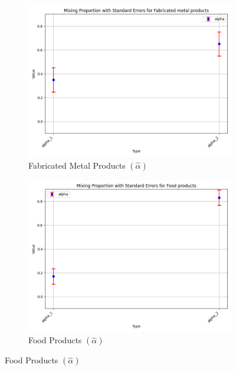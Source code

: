 \documentclass{article}
\begin{document}
\begin{figure}[ht!]
    \centering 
    \caption{I.I.D Normal Model}
    \begin{subfigure}[t]{0.32\textwidth}
        \centering
        \includegraphics[width=\textwidth]{figure/empirical_stat_normal_alpha_with_error_bars_Fabricated metal products.png}
        \caption{Fabricated Metal Products $(\hat\alpha)$}
    \end{subfigure}
    \begin{subfigure}[t]{0.32\textwidth}
        \centering
        \includegraphics[width=\textwidth]{figure/empirical_stat_normal_alpha_with_error_bars_Food products.png}
        \caption{Food Products  $(\hat\alpha)$}
    \end{subfigure}

\end{figure}
\end{document}
